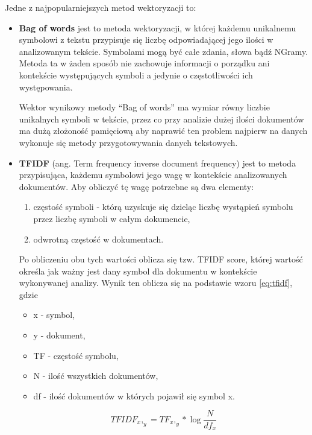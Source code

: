 Jedne z najpopularniejszych metod wektoryzacji to: ~\cite{ML}
\begin{itemize}
    \item \textbf{Bag of words} jest to metoda wektoryzacji, w której każdemu unikalnemu symbolowi z tekstu przypisuje się liczbę 
    odpowiadającej jego ilości w analizowanym tekście. Symbolami mogą być całe zdania, słowa bądź NGramy. 
    Metoda ta w żaden sposób nie zachowuje informacji o porządku ani kontekście występujących symboli a jedynie o 
    częstotliwości ich występowania. 
    
    Wektor wynikowy metody ``Bag of words'' ma wymiar równy liczbie unikalnych symboli w tekście, przez co przy analizie dużej ilości 
    dokumentów ma dużą złożoność pamięciową aby naprawić ten problem najpierw na danych wykonuje się metody przygotowywania danych tekstowych.

    \item \textbf{TFIDF} (ang. Term frequency inverse document frequency) jest to metoda przypisująca, każdemu symbolowi 
    jego wagę w kontekście analizowanych dokumentów. Aby obliczyć tę wagę potrzebne są dwa elementy:
    \begin{enumerate}
        \item częstość symboli - którą uzyskuje się dzieląc liczbę wystąpień symbolu przez liczbę symboli w całym dokumencie,
        \item odwrotną częstość w dokumentach.
    \end{enumerate}
    Po obliczeniu obu tych wartości oblicza się tzw. TFIDF score, której wartość określa jak ważny jest dany symbol 
    dla dokumentu w kontekście wykonywanej analizy. Wynik ten oblicza się na podstawie wzoru \ref{eq:tfidf}, gdzie
    \begin{itemize}
        \item x - symbol,
        \item y - dokument,
        \item TF - częstość symbolu,
        \item N - ilość wszystkich dokumentów,
        \item df - ilość dokumentów w których pojawił się symbol x.
    \end{itemize}

    \begin{equation}
        \label{eq:tfidf}
        TFIDF_x,_y = TF_x,_y* \log{\frac{N}{df_x}}
    \end{equation}
\end{itemize}